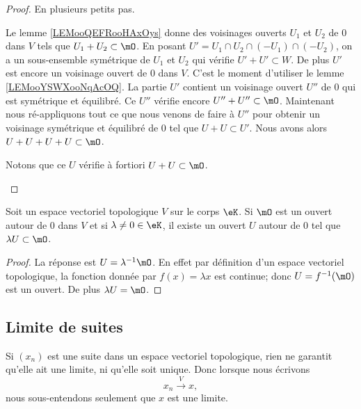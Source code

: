 \begin{proof}
	En plusieurs petits pas.
	\begin{subproof}
		Le lemme \ref{LEMooQEFRooHAxOys} donne des voisinages ouverts \( U_1\) et \( U_2\) de \( 0\) dans \( V\) tels que \( U_1+U_2\subset \mO\).
		\spitem[Symétrique]
		En posant \( U' = U_1 \cap U_2 \cap (-U_1) \cap (-U_2) \), on a un sous-ensemble symétrique de \( U_1\) et \(U_2\) qui vérifie \( U' + U'\subset W \). De plus \( U'\) est encore un voisinage ouvert de \( 0\) dans \( V\).
		\spitem[équilibré]
		C'est le moment d'utiliser le lemme \ref{LEMooYSWXooNqAcOQ}. La partie \( U'\) contient un voisinage ouvert \( U''\) de \( 0\) qui est symétrique et équilibré. Ce \( U''\) vérifie encore \( U''+U''\subset \mO\).
		\spitem[En \( 4\) parties]
		Maintenant nous ré-appliquons tout ce que nous venons de faire à \( U''\) pour obtenir un voisinage symétrique et équilibré de \( 0\) tel que \( U+U\subset U'\). Nous avons alors \( U+U+U+U\subset \mO\).

		Notons que ce \( U\) vérifie à fortiori \( U+U\subset \mO\).
	\end{subproof}
\end{proof}


\begin{lemma}            \label{LEMooEZIYooBBxdJj}
	Soit un espace vectoriel topologique \( V\) sur le corps \( \eK\). Si \( \mO\) est un ouvert autour de \( 0\) dans \( V\) et si \( \lambda\neq 0\in \eK\), il existe un ouvert \( U\) autour de \( 0\) tel que \( \lambda U\subset \mO\).
\end{lemma}

\begin{proof}
	La réponse est \( U=\lambda^{-1}\mO\). En effet par définition d'un espace vectoriel topologique, la fonction donnée par \( f(x)=\lambda x  \) est continue; donc \( U=f^{-1}(\mO)\) est un ouvert. De plus \( \lambda U=\mO\).
\end{proof}


\subsection{Limite de suites}

Si \( (x_n)\) est une suite dans un espace vectoriel topologique, rien ne garantit qu'elle ait une limite, ni qu'elle soit unique. Donc lorsque nous écrivons
\begin{equation}
	x_n\stackrel{V}{\longrightarrow}x,
\end{equation}
nous sous-entendons seulement que \( x\) est une limite.

